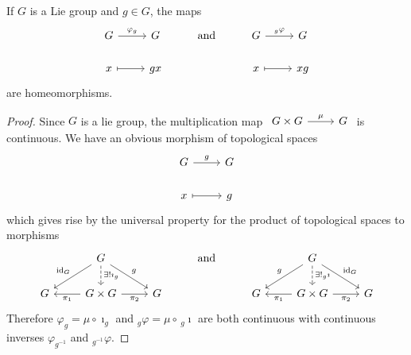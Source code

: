 \documentclass[10pt]{amsart}
\begin{document}
\begin{lem}\label{lem1}
  If $G$ is a Lie group and $g \in G$, the maps
  $$\begin{tikzcd}
    G \arrow{r}{\varphi_g} & G & \text{and} & G \arrow{r}{_g\varphi} & G\\
    x \arrow[mapsto]{r} & gx & & x \arrow[mapsto]{r} & xg
  \end{tikzcd}$$
  are homeomorphisms.
  \begin{proof}
    Since $G$ is a lie group, the multiplication map 
    $\begin{tikzcd}
      G \times G \arrow{r}{\mu} & G 
    \end{tikzcd}$
      is continuous.
      We have an obvious morphism of topological spaces
      $$\begin{tikzcd}
        G \arrow{r}{g} & G\\
        x \arrow[mapsto]{r} & g
      \end{tikzcd}$$
      which gives rise by the universal property for the product of topological spaces to morphisms
      $$\begin{tikzcd}
        & G \arrow[swap]{ld}{\operatorname{id}_G} \arrow{rd}{g} \arrow[dashed]{d}{\exists !\imath_g} & &\text{and} & & G\arrow[swap]{ld}{g} \arrow{rd}{\operatorname{id}_G}\arrow[dashed]{d}{\exists ! _g\imath}\\
        G & \arrow{l}{\pi_1} G \times G \arrow[swap]{r}{\pi_2} & G & & G & \arrow{l}{\pi_1} G \times G \arrow[swap]{r}{\pi_2} & G
      \end{tikzcd}$$
      Therefore $\varphi_g = \mu \circ \imath_g$ and $_g\varphi = \mu \circ\,_g\imath$ are both continuous with continuous inverses $\varphi_{g^{-1}}$ and $_{g^{-1}}\varphi$.
  \end{proof}
\end{lem}
\end{document}
